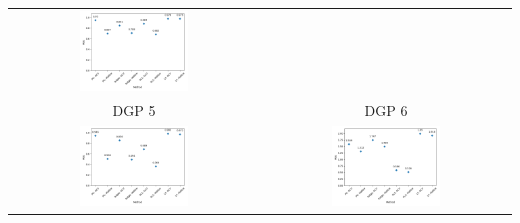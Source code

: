 \begin{table}[h! ]
\begin{tabular}{c c}
         \includegraphics[width=0.45\textwidth]{figures/N100_T50_DGP4_Sims1000} \\
         DGP 5 & DGP 6 \\
         \includegraphics[width=0.45\textwidth]{figures/N100_T50_DGP5_Sims1000} &
         \includegraphics[width=0.45\textwidth]{figures/N100_T50_DGP6_Sims1000}
     \end{tabular}
\end{table}

